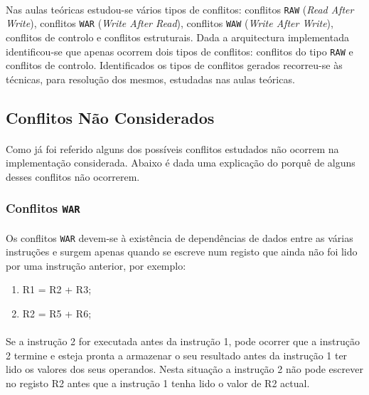 \paragraph{} Nas aulas teóricas estudou-se vários tipos de conflitos: conflitos \texttt{RAW} (\textit{Read After Write}), conflitos \texttt{WAR} (\textit{Write After Read}), conflitos \texttt{WAW} (\textit{Write After Write}), conflitos de controlo e conflitos estruturais. Dada a arquitectura implementada identificou-se que apenas ocorrem dois tipos de conflitos: conflitos do tipo \texttt{RAW} e conflitos de controlo. Identificados os tipos de conflitos gerados recorreu-se às técnicas, para resolução dos mesmos, estudadas nas aulas teóricas. 

\subsection{Conflitos Não Considerados }

\paragraph{} Como já foi referido alguns dos possíveis conflitos estudados não ocorrem na implementação considerada. Abaixo é dada uma explicação do porquê de alguns desses conflitos não ocorrerem.

\subsubsection{Conflitos \texttt{WAR} }

\paragraph{} Os conflitos \texttt{WAR} devem-se à existência de dependências de dados entre as várias instruções e surgem apenas quando se escreve num registo que ainda não foi lido por uma instrução anterior, por exemplo:

\begin{enumerate}
	\item R1 = R2 + R3;
	\item R2 = R5 + R6;
\end{enumerate}

\paragraph{} Se a instrução 2 for executada antes da instrução 1, pode ocorrer que a instrução 2 termine e esteja pronta a armazenar o seu resultado antes da instrução 1 ter lido os valores dos seus operandos. Nesta situação a instrução 2 não pode escrever no registo R2 antes que a instrução 1 tenha lido o valor de R2 actual.

